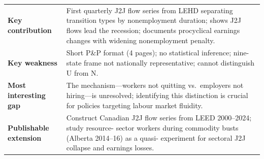 \vspace{6pt}
\begin{quickref}
\begin{tabularx}{\linewidth}{@{}lX@{}}
\textbf{Key contribution} &
  First quarterly J2J flow series from LEHD separating transition types by
  nonemployment duration; shows J2J flows lead the recession; documents
  procyclical earnings changes with widening nonemployment penalty. \\[4pt]
\textbf{Key weakness} &
  Short P\&P format (4 pages); no statistical inference; nine-state frame
  not nationally representative; cannot distinguish U from N. \\[4pt]
\textbf{Most interesting gap} &
  The mechanism---workers not quitting vs.\ employers not hiring---is
  unresolved; identifying this distinction is crucial for policies targeting
  labour market fluidity. \\[4pt]
\textbf{Publishable extension} &
  Construct Canadian J2J flow series from LEED 2000--2024; study resource-
  sector workers during commodity busts (Alberta 2014--16) as a quasi-
  experiment for sectoral J2J collapse and earnings losses.
\end{tabularx}
\end{quickref}
